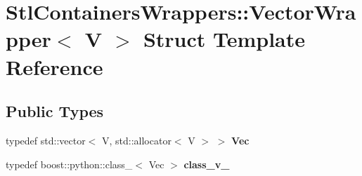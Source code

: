 \hypertarget{struct_stl_containers_wrappers_1_1_vector_wrapper}{
\section{StlContainersWrappers::VectorWrapper$<$ V $>$ Struct Template Reference}
\label{struct_stl_containers_wrappers_1_1_vector_wrapper}
}
\subsection*{Public Types}
\begin{DoxyCompactItemize}
\item 
\hypertarget{struct_stl_containers_wrappers_1_1_vector_wrapper_a5fa0d426b0cfe9e558d3b97e50d0f2c7}{
typedef std::vector$<$ V, std::allocator$<$ V $>$ $>$ {\bfseries Vec}}
\label{struct_stl_containers_wrappers_1_1_vector_wrapper_a5fa0d426b0cfe9e558d3b97e50d0f2c7}

\item 
\hypertarget{struct_stl_containers_wrappers_1_1_vector_wrapper_a352c08d1df28293bf0476105bb62dc6b}{
typedef boost::python::class\_\-$<$ Vec $>$ {\bfseries class\_\-v\_\-}}
\label{struct_stl_containers_wrappers_1_1_vector_wrapper_a352c08d1df28293bf0476105bb62dc6b}

\end{DoxyCompactItemize}
